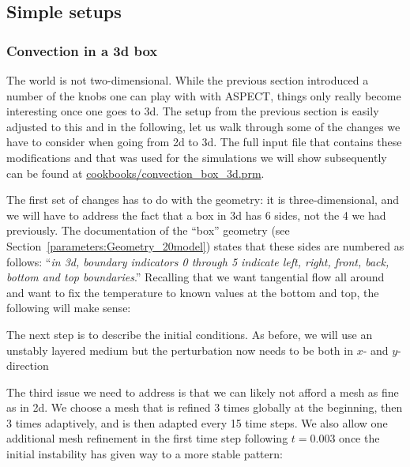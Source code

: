 \documentclass{article}
\newcommand{\aspect}{\textsc{ASPECT}}
\begin{document}
\subsection{Simple setups}
\label{sec:cookbooks-simple}



\subsubsection{Convection in a 3d box}
\label{sec:cookbooks-simple-box-3d}

The world is not two-dimensional. While the previous section introduced a number
of the knobs one can play with with \aspect{}, things only really become
interesting once one goes to 3d. The setup from the previous section is easily
adjusted to this and in the following, let us walk through some of the changes
we have to consider when going from 2d to 3d. The full input file that
contains these modifications and that was used for the simulations we will show
subsequently can be found at \url{cookbooks/convection\_box\_3d.prm}.

The first set of changes has to do with the geometry: it is three-dimensional,
and we will have to address the fact that a box in 3d has 6 sides, not the 4 we
had previously. The documentation of the ``box'' geometry
(see Section~\ref{parameters:Geometry_20model}) states that these sides are
numbered as follows: ``\textit{in 3d, boundary indicators 0 through 5 indicate
left, right, front, back, bottom and top boundaries}.'' Recalling that we want
tangential flow all around and want to fix the temperature to known values at
the bottom and top, the following will make sense:



The next step is to describe the initial conditions. As before, we will use an
unstably layered medium but the perturbation now needs to be both in $x$- and
$y$-direction


The third issue we need to address is that we can likely not afford a mesh as
fine as in 2d. We choose a mesh that is refined 3 times globally at the
beginning, then 3 times adaptively, and is then adapted every 15 time steps. We
also allow one additional mesh refinement in the first time step following
$t=0.003$ once the initial instability has given way to a more stable pattern:

\end{document}
